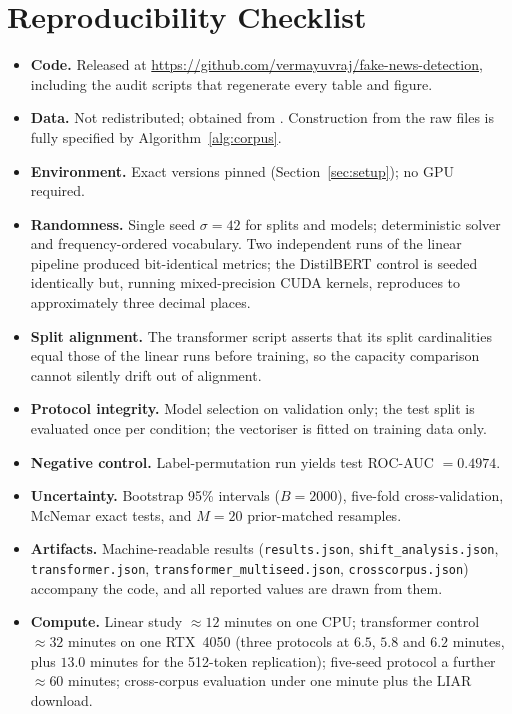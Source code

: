 \documentclass[conference]{IEEEtran}
\begin{document}
\section{Reproducibility Checklist}
\label{app:checklist}
\begin{itemize}
  \item \textbf{Code.} Released at
    \url{https://github.com/vermayuvraj/fake-news-detection}, including the
    audit scripts that regenerate every table and figure.
  \item \textbf{Data.} Not redistributed; obtained from
    \cite{bisaillon2020dataset}. Construction from the raw files is fully
    specified by Algorithm~\ref{alg:corpus}.
  \item \textbf{Environment.} Exact versions pinned
    (Section~\ref{sec:setup}); no GPU required.
  \item \textbf{Randomness.} Single seed $\sigma=42$ for splits and models;
    deterministic solver and frequency-ordered vocabulary. Two independent runs
    of the linear pipeline produced bit-identical metrics; the DistilBERT
    control is seeded identically but, running mixed-precision CUDA kernels,
    reproduces to approximately three decimal places.
  \item \textbf{Split alignment.} The transformer script asserts that its split
    cardinalities equal those of the linear runs before training, so the
    capacity comparison cannot silently drift out of alignment.
  \item \textbf{Protocol integrity.} Model selection on validation only; the
    test split is evaluated once per condition; the vectoriser is fitted on
    training data only.
  \item \textbf{Negative control.} Label-permutation run yields test
    ROC-AUC $=0.4974$.
  \item \textbf{Uncertainty.} Bootstrap 95\% intervals ($B{=}2000$), five-fold
    cross-validation, McNemar exact tests, and $M{=}20$ prior-matched
    resamples.
  \item \textbf{Artifacts.} Machine-readable results
    (\texttt{results.json}, \texttt{shift\_analysis.json},
    \texttt{transformer.json}, \texttt{transformer\_multiseed.json},
    \texttt{crosscorpus.json}) accompany the code, and all reported values are
    drawn from them.
  \item \textbf{Compute.} Linear study $\approx12$ minutes on one CPU;
    transformer control $\approx32$ minutes on one RTX~4050 (three protocols
    at $6.5$, $5.8$ and $6.2$ minutes, plus $13.0$ minutes for the 512-token
    replication); five-seed protocol a further $\approx60$ minutes; cross-corpus
    evaluation under one minute plus the LIAR download.
\end{itemize}
\end{document}

